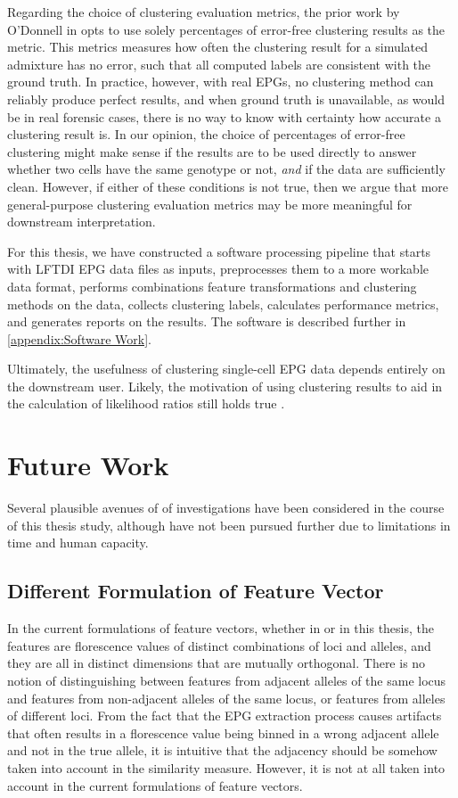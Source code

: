 Regarding the choice of clustering evaluation metrics, the prior work by O'Donnell in \cite{odonnell_clustering_2021} opts to use solely percentages of error-free clustering results as the metric. This metrics measures how often the clustering result for a simulated admixture has no error, such that all computed labels are consistent with the ground truth. In practice, however, with real EPGs, no clustering method can reliably produce perfect results, and when ground truth is unavailable, as would be in real forensic cases, there is no way to know with certainty how accurate a clustering result is. In our opinion, the choice of percentages of error-free clustering might make sense if the results are to be used directly to answer whether two cells have the same genotype or not, \emph{and} if the data are sufficiently clean. However, if either of these conditions is not true, then we argue that more general-purpose clustering evaluation metrics may be more meaningful for downstream interpretation.

For this thesis, we have constructed a software processing pipeline that starts with LFTDI EPG data files as inputs, preprocesses them to a more workable data format, performs combinations feature transformations and clustering methods on the data, collects clustering labels, calculates performance metrics, and generates reports on the results. The software is described further in \cref{appendix:Software Work}.

Ultimately, the usefulness of clustering single-cell EPG data depends entirely on the downstream user. Likely, the motivation of using clustering results to aid in the calculation of likelihood ratios still holds true \cite{grgicak_large-scale_2020}.

\section{Future Work}

Several plausible avenues of of investigations have been considered in the course of this thesis study, although have not been pursued further due to limitations in time and human capacity.

\subsection{Different Formulation of Feature Vector}

In the current formulations of feature vectors, whether in \cite{odonnell_clustering_2021} or in this thesis, the features are florescence values of distinct combinations of loci and alleles, and they are all in distinct dimensions that are mutually orthogonal. There is no notion of distinguishing between features from adjacent alleles of the same locus and features from non-adjacent alleles of the same locus, or features from alleles of different loci. From the fact that the EPG extraction process causes artifacts that often results in a florescence value being binned in a wrong adjacent allele and not in the true allele, it is intuitive that the adjacency should be somehow taken into account in the similarity measure. However, it is not at all taken into account in the current formulations of feature vectors.

